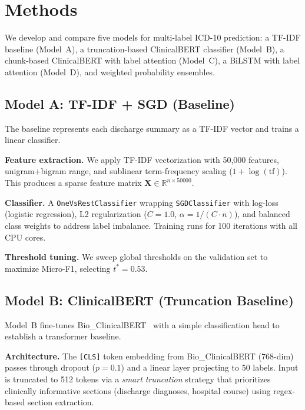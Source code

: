 \documentclass[11pt,a4paper]{article}
\begin{document}
\section{Methods}

We develop and compare five models for multi-label ICD-10 prediction: a TF-IDF baseline (Model~A), a truncation-based ClinicalBERT classifier (Model~B), a chunk-based ClinicalBERT with label attention (Model~C), a BiLSTM with label attention (Model~D), and weighted probability ensembles.

\subsection{Model A: TF-IDF + SGD (Baseline)}

The baseline represents each discharge summary as a TF-IDF vector and trains a linear classifier.

\textbf{Feature extraction.} We apply TF-IDF vectorization with 50,000 features, unigram+bigram range, and sublinear term-frequency scaling ($1 + \log(\text{tf})$). This produces a sparse feature matrix $\mathbf{X} \in \mathbb{R}^{n \times 50000}$.

\textbf{Classifier.} A \texttt{OneVsRestClassifier} wrapping \texttt{SGDClassifier} with log-loss (logistic regression), L2 regularization ($C = 1.0$, $\alpha = 1/(C \cdot n)$), and balanced class weights to address label imbalance. Training runs for 100 iterations with all CPU cores.

\textbf{Threshold tuning.} We sweep global thresholds on the validation set to maximize Micro-F1, selecting $t^* = 0.53$.

\subsection{Model B: ClinicalBERT (Truncation Baseline)}

Model~B fine-tunes Bio\_ClinicalBERT~\cite{alsentzer2019publicly} with a simple classification head to establish a transformer baseline.

\textbf{Architecture.} The \texttt{[CLS]} token embedding from Bio\_ClinicalBERT (768-dim) passes through dropout ($p = 0.1$) and a linear layer projecting to 50 labels. Input is truncated to 512 tokens via a \emph{smart truncation} strategy that prioritizes clinically informative sections (discharge diagnoses, hospital course) using regex-based section extraction.
\end{document}
